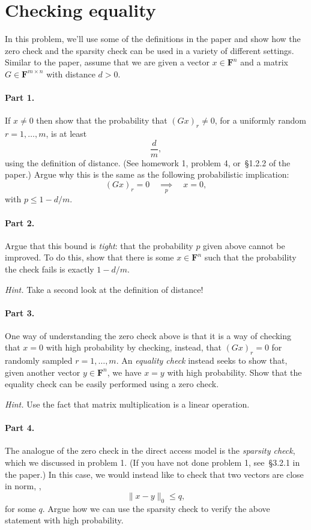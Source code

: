 \documentclass[12pt]{article}
\newcommand{\field}{\mathbf{F}}
\newcommand{\impliesn}[1]{\underset{#1}{\implies}}
\newcommand{\impliesp}{\impliesn{p}}
\begin{document}
\section{Checking equality}
In this problem, we'll use some of the definitions in the paper and show how
the zero check and the sparsity check can be used in a variety of different
settings. Similar to the paper, assume that we are given a vector $x \in
\field^n$ and a matrix $G \in \field^{m \times n}$ with distance $d > 0$.

\paragraph{Part 1.} If $x \ne 0$ then show that the probability that $(Gx)_r \ne 0$,
for a uniformly random $r=1, \dots, m$, is at least
\[
    \frac{d}{m},
\]
using the definition of distance. (See homework 1, problem 4, or~\S1.2.2 of the
paper.) Argue why this is the same as the following probabilistic implication:
\[
    (Gx)_r = 0 \quad \impliesp \quad x = 0,
\]
with $p \le 1-d/m$.

\paragraph{Part 2.} Argue that this bound is \emph{tight}: that the probability
$p$ given above cannot be improved. To do this, show that there is some $x \in
\field^n$ such that the probability the check fails is exactly $1-d/m$.

\emph{Hint.} Take a second look at the definition of distance!

\paragraph{Part 3.} One way of understanding the zero check above is that it is
a way of checking that $x = 0$ with high probability by checking, instead, that
$(Gx)_r = 0$ for randomly sampled $r=1, \dots, m$. An \emph{equality check}
instead seeks to show that, given another vector $y \in \field^n$, we have $x =
y$ with high probability. Show that the equality check can be easily performed
using a zero check.

\emph{Hint.} Use the fact that matrix multiplication is a linear operation.

\paragraph{Part 4.} The analogue of the zero check in the direct access model
is the \emph{sparsity check}, which we discussed in problem 1. (If you have not
done problem 1, see~\S3.2.1 in the paper.) In this case, we would instead like
to check that two vectors are close in norm, \ie,
\[
    \|x - y\|_0 \le q,
\]
for some $q$. Argue how we can use the sparsity check to verify the above
statement with high probability.
\end{document}

